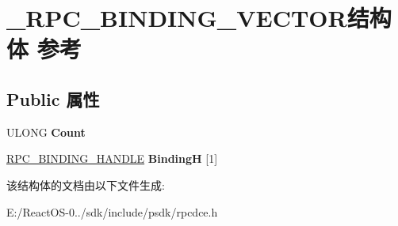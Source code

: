 \hypertarget{struct___r_p_c___b_i_n_d_i_n_g___v_e_c_t_o_r}{}\section{\+\_\+\+R\+P\+C\+\_\+\+B\+I\+N\+D\+I\+N\+G\+\_\+\+V\+E\+C\+T\+O\+R结构体 参考}
\label{struct___r_p_c___b_i_n_d_i_n_g___v_e_c_t_o_r}
\subsection*{Public 属性}
\begin{DoxyCompactItemize}
\item 
\mbox{\label{struct___r_p_c___b_i_n_d_i_n_g___v_e_c_t_o_r_a144c08db9908d25a5c73f63301dcfff4}} 
U\+L\+O\+NG {\bfseries Count}
\item 
\mbox{\label{struct___r_p_c___b_i_n_d_i_n_g___v_e_c_t_o_r_a38cb571c2c6d346d7433050c2acfac47}} 
\hyperlink{interfacevoid}{R\+P\+C\+\_\+\+B\+I\+N\+D\+I\+N\+G\+\_\+\+H\+A\+N\+D\+LE} {\bfseries BindingH} \mbox{[}1\mbox{]}
\end{DoxyCompactItemize}


该结构体的文档由以下文件生成\+:\begin{DoxyCompactItemize}
\item 
E\+:/\+React\+O\+S-\/0../sdk/include/psdk/rpcdce.\+h\end{DoxyCompactItemize}

